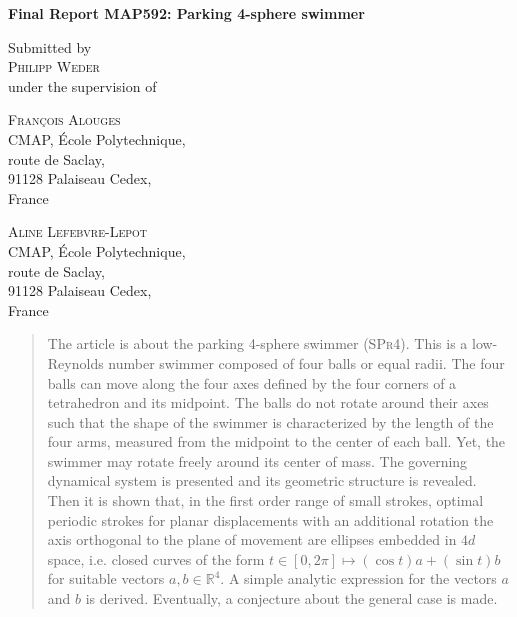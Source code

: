 \documentclass[10pt,a4paper]{article}
\author{Philipp Weder}
\date{}
\numberwithin{equation}{section}
\theoremstyle{plain}
\theoremstyle{plain}
\theoremstyle{plain}
\theoremstyle{remark}
\theoremstyle{definition}
\theoremstyle{definition}
\theoremstyle{plain}
\theoremstyle{plain}
\newcommand{\R}{\mathbb{R}}
\newcommand{\spr}{\textsc{SPr4}}
\begin{document}
\thispagestyle{plain}
\begin{center}
\begin{Large}
\textbf{Final Report MAP592: Parking 4-sphere swimmer}\\
\end{Large}
\vspace{1em}
Submitted by\\
\textsc{Philipp Weder}\\
under the supervision of\\
\end{center}
\vspace{1em}
\begin{minipage}[t]{0.5\textwidth}
\begin{center}
\textsc{François Alouges}\\
CMAP, École Polytechnique,\\
route de Saclay,\\
91128 Palaiseau Cedex,\\
France
\end{center}
\end{minipage}
\begin{minipage}[t]{0.5\textwidth}
\begin{center}
\textsc{Aline Lefebvre-Lepot}\\
CMAP, École Polytechnique,\\
route de Saclay,\\
91128 Palaiseau Cedex,\\
France
\end{center}
\end{minipage}

\begin{abstract}
The article is about the parking 4-sphere swimmer (\spr). This is a low-Reynolds number swimmer composed of four balls or equal radii. The four balls can move along the four axes defined by the four corners of a tetrahedron and its midpoint. The balls do not rotate around their axes such that the shape of the swimmer is characterized by the length of the four arms, measured from the midpoint to the center of each ball. Yet, the swimmer may rotate freely around its center of mass. The governing dynamical system is presented and its geometric structure is revealed. Then it is shown that, in the first order range of small strokes, optimal periodic strokes for planar displacements with an additional rotation the axis orthogonal to the plane of movement are ellipses embedded in $4d$ space, i.e. closed curves of the form $t \in [0, 2 \pi] \mapsto (\cos t) a + (\sin t) b$ for suitable vectors $a, b \in \R^4$. A simple analytic expression for the vectors $a$ and $b$ is derived. Eventually, a conjecture about the general case is made.
\end{abstract}
\end{document}
